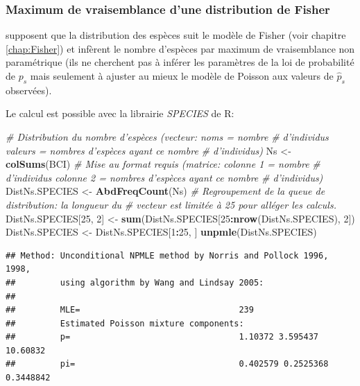 \documentclass[
  11pt,
  french,
  a4paper,
  extrafontsizes,onecolumn,openright
  ]{memoir}
\newenvironment{Shaded}{\begin{snugshade}}{\end{snugshade}}
\newcommand{\CommentTok}[1]{\textcolor[rgb]{0.56,0.35,0.01}{\textit{#1}}}
\newcommand{\DecValTok}[1]{\textcolor[rgb]{0.00,0.00,0.81}{#1}}
\newcommand{\KeywordTok}[1]{\textcolor[rgb]{0.13,0.29,0.53}{\textbf{#1}}}
\newcommand{\NormalTok}[1]{#1}
\newcommand{\OperatorTok}[1]{\textcolor[rgb]{0.81,0.36,0.00}{\textbf{#1}}}
\newcommand{\StringTok}[1]{\textcolor[rgb]{0.31,0.60,0.02}{#1}}
\begin{document}
\normalsize

\hypertarget{maximum-de-vraisemblance-dune-distribution-de-fisher}{%
\subsubsection{Maximum de vraisemblance d'une distribution de Fisher}\label{maximum-de-vraisemblance-dune-distribution-de-fisher}}

\textcite{Norris1998} supposent que la distribution des espèces suit le modèle de Fisher (voir chapitre \ref{chap:Fisher}) et infèrent le nombre d'espèces par maximum de vraisemblance non paramétrique (ils ne cherchent pas à inférer les paramètres de la loi de probabilité de \(p_s\) mais seulement à ajuster au mieux le modèle de Poisson aux valeurs de \({\hat{p}}_s\) observées).

Le calcul est possible avec la librairie \emph{SPECIES} de R:

\scriptsize

\begin{Shaded}
\begin{Highlighting}[]
\CommentTok{# Distribution du nombre d'espèces (vecteur: noms = nombre}
\CommentTok{# d'individus valeurs = nombres d'espèces ayant ce nombre}
\CommentTok{# d'individus)}
\NormalTok{Ns <-}\StringTok{ }\KeywordTok{colSums}\NormalTok{(BCI)}
\CommentTok{# Mise au format requis (matrice: colonne 1 = nombre}
\CommentTok{# d'individus colonne 2 = nombres d'espèces ayant ce nombre}
\CommentTok{# d'individus)}
\NormalTok{DistNs.SPECIES <-}\StringTok{ }\KeywordTok{AbdFreqCount}\NormalTok{(Ns)}
\CommentTok{# Regroupement de la queue de distribution: la longueur du}
\CommentTok{# vecteur est limitée à 25 pour alléger les calculs.}
\NormalTok{DistNs.SPECIES[}\DecValTok{25}\NormalTok{, }\DecValTok{2}\NormalTok{] <-}\StringTok{ }\KeywordTok{sum}\NormalTok{(DistNs.SPECIES[}\DecValTok{25}\OperatorTok{:}\KeywordTok{nrow}\NormalTok{(DistNs.SPECIES), }
    \DecValTok{2}\NormalTok{])}
\NormalTok{DistNs.SPECIES <-}\StringTok{ }\NormalTok{DistNs.SPECIES[}\DecValTok{1}\OperatorTok{:}\DecValTok{25}\NormalTok{, ]}
\KeywordTok{unpmle}\NormalTok{(DistNs.SPECIES)}
\end{Highlighting}
\end{Shaded}

\begin{verbatim}
## Method: Unconditional NPMLE method by Norris and Pollock 1996, 1998, 
##         using algorithm by Wang and Lindsay 2005: 
## 
##         MLE=                                239 
##         Estimated Poisson mixture components:       
##         p=                                  1.10372 3.595437 10.60832 
##         pi=                                 0.402579 0.2525368 0.3448842
\end{verbatim}
\end{document}
